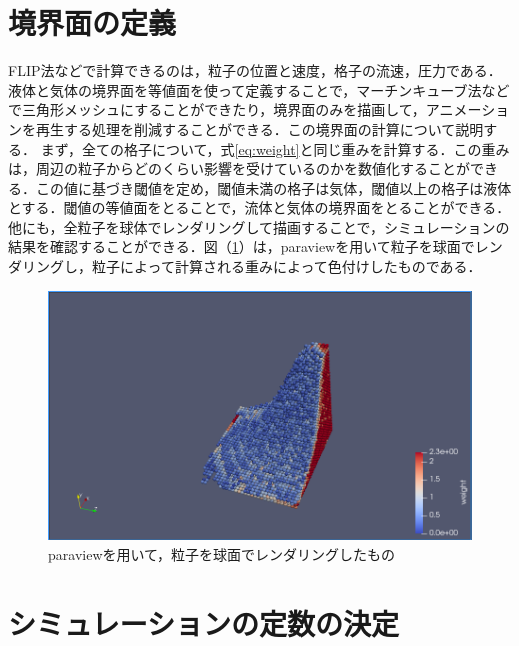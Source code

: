 \documentclass[a4j,12pt]{jreport}
\begin{document}
\section{境界面の定義} \label{sec:boundaly_def}
FLIP法などで計算できるのは，粒子の位置と速度，格子の流速，圧力である．液体と気体の境界面を等値面を使って定義することで，マーチンキューブ法などで三角形メッシュにすることができたり，境界面のみを描画して，アニメーションを再生する処理を削減することができる．この境界面の計算について説明する．
まず，全ての格子について，式\ref{eq:weight}と同じ重みを計算する．この重みは，周辺の粒子からどのくらい影響を受けているのかを数値化することができる．この値に基づき閾値を定め，閾値未満の格子は気体，閾値以上の格子は液体とする．閾値の等値面をとることで，流体と気体の境界面をとることができる．他にも，全粒子を球体でレンダリングして描画することで，シミュレーションの結果を確認することができる．図（\ref{fig:paraview}）は，paraviewを用いて粒子を球面でレンダリングし，粒子によって計算される重みによって色付けしたものである．
\begin{figure}[htbp]
\begin{center}
\includegraphics[width=160mm]{paraview.png}
\end{center}
\caption{paraviewを用いて，粒子を球面でレンダリングしたもの}
\label{fig:paraview}

\end{figure}\section{シミュレーションの定数の決定} \label{sec:constant}
\end{document}
